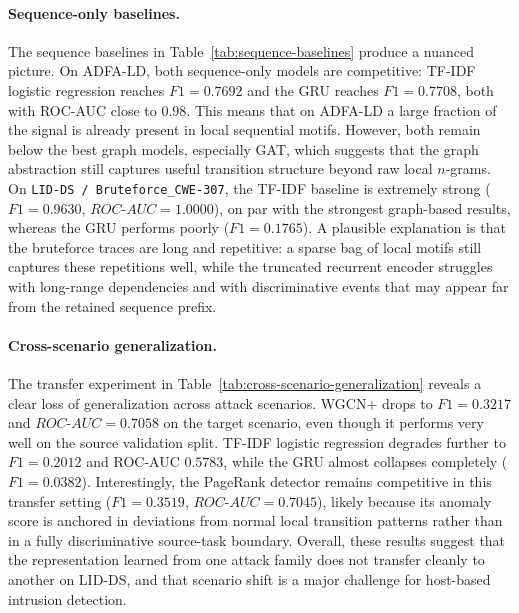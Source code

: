 \documentclass{article}
\begin{document}
\paragraph{Sequence-only baselines.}
The sequence baselines in Table~\ref{tab:sequence-baselines} produce a nuanced picture. On ADFA-LD, both sequence-only models are competitive: TF-IDF logistic regression reaches $F1=0.7692$ and the GRU reaches $F1=0.7708$, both with ROC-AUC close to $0.98$. This means that on ADFA-LD a large fraction of the signal is already present in local sequential motifs. However, both remain below the best graph models, especially GAT, which suggests that the graph abstraction still captures useful transition structure beyond raw local $n$-grams. On \texttt{LID-DS / Bruteforce\_CWE-307}, the TF-IDF baseline is extremely strong ($F1=0.9630$, $ROC$-$AUC=1.0000$), on par with the strongest graph-based results, whereas the GRU performs poorly ($F1=0.1765$). A plausible explanation is that the bruteforce traces are long and repetitive: a sparse bag of local motifs still captures these repetitions well, while the truncated recurrent encoder struggles with long-range dependencies and with discriminative events that may appear far from the retained sequence prefix.

\paragraph{Cross-scenario generalization.}
The transfer experiment in Table~\ref{tab:cross-scenario-generalization} reveals a clear loss of generalization across attack scenarios. WGCN+ drops to $F1=0.3217$ and $ROC$-$AUC=0.7058$ on the target scenario, even though it performs very well on the source validation split. TF-IDF logistic regression degrades further to $F1=0.2012$ and ROC-AUC $0.5783$, while the GRU almost collapses completely ($F1=0.0382$). Interestingly, the PageRank detector remains competitive in this transfer setting ($F1=0.3519$, $ROC$-$AUC=0.7045$), likely because its anomaly score is anchored in deviations from normal local transition patterns rather than in a fully discriminative source-task boundary. Overall, these results suggest that the representation learned from one attack family does not transfer cleanly to another on LID-DS, and that scenario shift is a major challenge for host-based intrusion detection.
\end{document}
